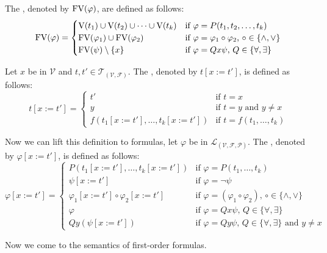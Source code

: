 \begin{definition}
The , denoted by $\text{FV}(\varphi)$, are defined as follows:
\[\FV(\varphi)=
\begin{cases} %
\V(t_1)\cup \V(t_2)\cup\dots\cup \V(t_k) & \text{if $\varphi=P(t_1,t_2,\dots,t_k)$}\\
\FV(\varphi_1)\cup\FV(\varphi_2) & \text{if $\varphi=\varphi_1\circ\varphi_2$, $\circ\in\{\wedge,\vee\}$}\\
\FV(\psi)\setminus\{x\} & \text{if $\varphi=Q x\psi$, $Q\in\{\forall,\exists\}$}
\end{cases}\]
\end{definition}

\begin{definition}
Let $x$ be in $\mathcal{V}$ and $t,t'\in\mathcal{T}_{(\mathcal{V},\mathcal{F})}$. The , denoted by $t\left[x:=t'\right]$, is defined as follows:
\[t\left[x:=t'\right]=
\begin{cases}
t' & \text{if $t=x$}\\ 
y & \text{if $t=y$ and $y\neq x$}\\%
f(t_1\left[x:=t'\right],\dots,t_k\left[x:=t'\right]) & \text{if $t=f(t_1,\dots,t_k)$}
\end{cases}\]

Now we can lift this definition to formulas, let $\varphi$ be in $\mathcal{L}_{(\mathcal{V},\mathcal{F},\mathcal{P})}$. The , denoted by $\varphi\left[x:=t'\right]$, is defined as follows:
\[\varphi\left[x:=t'\right]=
\begin{cases}
P(t_1\left[x:=t'\right],\dots,t_k\left[x:=t'\right]) & \text{if $\varphi=P(t_1,\dots,t_k)$}\\
\psi\left[x:=t'\right] & \text{if $\varphi=\neg\psi$}\\
\varphi_1\left[x:=t'\right]\circ\varphi_2\left[x:=t'\right] & \text{if $\varphi=(\varphi_1\circ\varphi_2)$, $\circ\in\{\wedge,\vee\}$}\\
\varphi & \text{if $\varphi=Q x\psi$, $Q\in\{\forall,\exists\}$}\\
Q y(\psi\left[x:=t'\right]) & \text{if $\varphi=Q y\psi$, $Q\in\{\forall,\exists\}$ and $y\neq x$}
\end{cases}\]

\end{definition}
Now we come to the semantics of first-order formulas.
